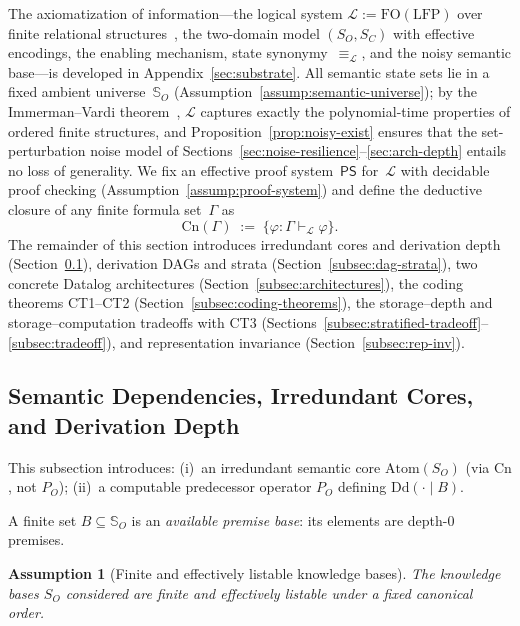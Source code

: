 \documentclass[journal]{IEEEtran}
\newcommand{\Dd}{\text{Dd}}
\newcommand{\Atom}{\text{Atom}}
\newcommand{\Cn}{\text{Cn}}
\newtheorem{assumption}{Assumption}[section]
\numberwithin{equation}{section}
\begin{document}
The axiomatization of information---the logical system
$\mathcal{L}:=\mathrm{FO(LFP)}$ over finite relational
structures~\cite{immerman1999descriptive}, the two-domain model
$(S_O,S_C)$ with effective encodings, the enabling mechanism,
state synonymy~$\equiv_{\mathcal{L}}$, and the noisy semantic
base---is developed in Appendix~\ref{sec:substrate}.
All semantic state sets lie in a fixed ambient
universe~$\mathbb{S}_O$
(Assumption~\ref{assump:semantic-universe});
by the Immerman--Vardi
theorem~\cite{immerman1982relational,vardi1982complexity},
$\mathcal{L}$ captures exactly the polynomial-time properties of
ordered finite structures, and
Proposition~\ref{prop:noisy-exist} ensures that the
set-perturbation noise model of
Sections~\ref{sec:noise-resilience}--\ref{sec:arch-depth} entails
no loss of generality.
We fix an effective proof system~$\mathsf{PS}$ for~$\mathcal{L}$
with decidable proof checking
(Assumption~\ref{assump:proof-system}) and define the deductive
closure of any finite formula set~$\Gamma$ as
\begin{equation}\label{eq:Cn-def}
  \Cn(\Gamma)
  \;:=\;
  \bigl\{\varphi:\Gamma\vdash_{\mathcal{L}}\varphi\bigr\}.
\end{equation}
The remainder of this section introduces irredundant cores and
derivation depth (Section~\ref{subsec:atomic-derivation}),
derivation DAGs and strata (Section~\ref{subsec:dag-strata}),
two concrete Datalog architectures
(Section~\ref{subsec:architectures}), the coding theorems
CT1--CT2 (Section~\ref{subsec:coding-theorems}), the
storage--depth and storage--computation tradeoffs with CT3
(Sections~\ref{subsec:stratified-tradeoff}--\ref{subsec:tradeoff}),
and representation invariance (Section~\ref{subsec:rep-inv}).

\subsection{Semantic Dependencies, Irredundant Cores, and
  Derivation Depth}
\label{subsec:atomic-derivation}

This subsection introduces: (i)~an irredundant semantic core
$\Atom(S_O)$ (via $\Cn$, not $P_O$); (ii)~a computable predecessor
operator $P_O$ defining $\Dd(\cdot\mid B)$.

A finite set $B\subseteq\mathbb S_O$ is an \emph{available premise
base}: its elements are depth-$0$ premises.

\begin{assumption}[Finite and effectively listable knowledge bases]
\label{assump:finite-so}
The knowledge bases $S_O$ considered are finite and effectively
listable under a fixed canonical order.
\end{assumption}
\end{document}
